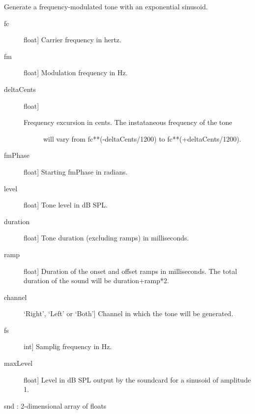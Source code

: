 \documentclass[letterpaper,10pt,english]{sphinxmanual}
\begin{document}
\begin{fulllineitems}
\label{index:sndlib.expSinFMTone}
Generate a frequency-modulated tone with an exponential sinusoid.
\begin{description}
\item[{fc}] \leavevmode{[}float{]}
Carrier frequency in hertz.

\item[{fm}] \leavevmode{[}float{]}
Modulation frequency in Hz.

\item[{deltaCents}] \leavevmode{[}float{]}\begin{description}
\item[{Frequency excursion in cents. The instataneous frequency of the tone}] \leavevmode
will vary from fc**(-deltaCents/1200) to fc**(+deltaCents/1200).

\end{description}

\item[{fmPhase}] \leavevmode{[}float{]}
Starting fmPhase in radians.

\item[{level}] \leavevmode{[}float{]}
Tone level in dB SPL.

\item[{duration}] \leavevmode{[}float{]}
Tone duration (excluding ramps) in milliseconds.

\item[{ramp}] \leavevmode{[}float{]}
Duration of the onset and offset ramps in milliseconds.
The total duration of the sound will be duration+ramp*2.

\item[{channel}] \leavevmode{[}`Right', `Left' or `Both'{]}
Channel in which the tone will be generated.

\item[{fs}] \leavevmode{[}int{]}
Samplig frequency in Hz.

\item[{maxLevel}] \leavevmode{[}float{]}
Level in dB SPL output by the soundcard for a sinusoid of
amplitude 1.

\end{description}

snd : 2-dimensional array of floats


\end{fulllineitems}
\end{document}
